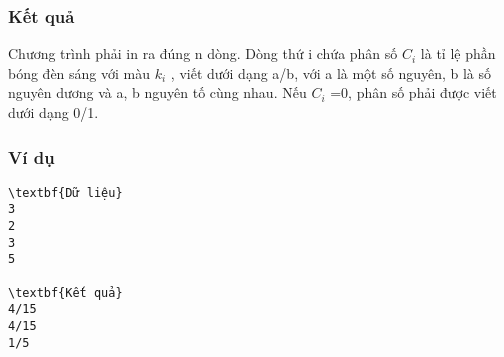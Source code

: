 \subsubsection{   Kết quả  }

   Chương trình phải in ra đúng n dòng. Dòng thứ i chứa phân số $C_{i}$   là tỉ lệ phần bóng đèn sáng với màu $k_{i}$   , viết dưới dạng a/b, với a là một số nguyên, b là số nguyên dương và a, b nguyên tố cùng nhau. Nếu $C_{i}$   =0, phân số phải được viết dưới dạng 0/1.  

\subsubsection{   Ví dụ  }
\begin{verbatim}
\textbf{Dữ liệu}
3
2
3
5

\textbf{Kết quả}
4/15
4/15
1/5
\end{verbatim}
